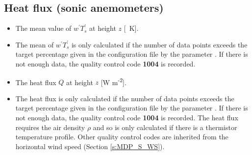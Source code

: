 \subsection{Heat flux (sonic anemometers)}  
\begin{itemize}
\item {} The mean value of $w^\prime T_s^\prime$ at height $z$ [\ms\ K].
\item {} The mean of $w^\prime T_s^\prime$ is only calculated if the number of data points exceeds the target percentage given in the configuration file by the parameter . If there is not enough data, the quality control code \textbf{1004} is recorded.
\item {} The heat flux $Q$ at height $z$ [W m\textsuperscript{-2}]. 
\item {} The heat flux is only calculated if the number of data points exceeds the target percentage given in the configuration file by the parameter . If there is not enough data, the quality control code \textbf{1004} is recorded. The heat flux requires the air density $\rho$ and so is only calculated if there is a thermistor temperature profile. Other quality control codes are inherited from the horizontal wind speed (Section \ref{s:MDP_S_WS}).
\end{itemize}

